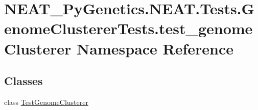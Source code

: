\hypertarget{namespaceNEAT__PyGenetics_1_1NEAT_1_1Tests_1_1GenomeClustererTests_1_1test__genomeClusterer}{}\section{N\+E\+A\+T\+\_\+\+Py\+Genetics.\+N\+E\+A\+T.\+Tests.\+Genome\+Clusterer\+Tests.\+test\+\_\+genome\+Clusterer Namespace Reference}
\label{namespaceNEAT__PyGenetics_1_1NEAT_1_1Tests_1_1GenomeClustererTests_1_1test__genomeClusterer}
\subsection*{Classes}
\begin{DoxyCompactItemize}
\item 
class \hyperlink{classNEAT__PyGenetics_1_1NEAT_1_1Tests_1_1GenomeClustererTests_1_1test__genomeClusterer_1_1TestGenomeClusterer}{Test\+Genome\+Clusterer}
\end{DoxyCompactItemize}
